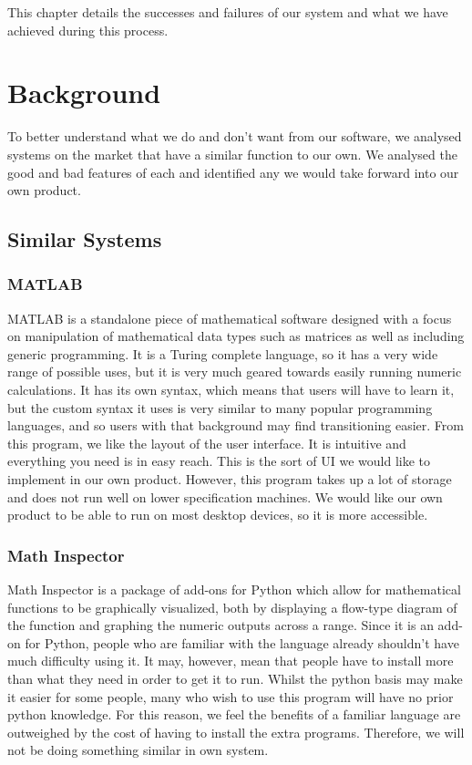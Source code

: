 \documentclass[a4paper, oneside, 11pt]{report}
\begin{document}
This chapter details the successes and failures of our system and what we have achieved during this process.

\chapter{Background}

To better understand what we do and don't want from our software, we analysed systems on the market that have a similar function to our own. We analysed the good and bad features of each and identified any we would take forward into our own product.

\section{Similar Systems}

\subsection{MATLAB\cite{MATLAB}}

MATLAB is a standalone piece of mathematical software designed with a focus on manipulation of mathematical data types such as matrices as well as including generic programming. 
It is a Turing complete language, so it has a very wide range of possible uses, but it is very much geared towards easily running numeric calculations. It has its own syntax,
which means that users will have to learn it, but the custom syntax it uses is very similar to many popular programming languages, and so users with that background may find transitioning easier.
From this program, we like the layout of the user interface. It is intuitive and everything you need is in easy reach. This is the sort of UI we would like to implement in our own product.
However, this program takes up a lot of storage and does not run well on lower specification machines. We would like our own product to be able to run on most desktop devices, so it is more accessible.

\subsection{Math Inspector\cite{Math_Inspector}}

Math Inspector is a package of add-ons for Python which allow for mathematical functions to be graphically visualized, both by displaying a flow-type diagram of the function and graphing the numeric outputs across a range.
 Since it is an add-on for Python, people who are familiar with the language already shouldn't have much difficulty using it. It may, however, mean that people have to install more than what they need in order to get it to run.
Whilst the python basis may make it easier for some people, many who wish to use this program will have no prior python knowledge. For this reason, we feel the benefits of a familiar language are outweighed by the cost of having to install the extra programs. Therefore, we will not be doing something similar in own system.
\end{document}
